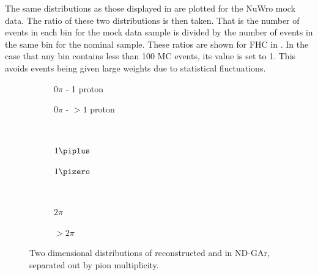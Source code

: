 The same distributions as those displayed in  are plotted for the NuWro mock data.
The ratio of these two distributions is then taken.
That is the number of events in each bin for the mock data sample is divided by the number of events in the same bin for the nominal sample.
These ratios are shown for FHC in .
In the case that any bin contains less than \num{100} MC events, its value is set to 1.
This avoids events being given large weights due to statistical fluctuations.

\begin{figure}[t]
	\begin{subfigure}[t]{.5\linewidth}
		\begin{adjustbox}{max totalsize=\linewidth, center}
			
		\end{adjustbox}
		\caption{$0\pi$ - 1 proton}
	\end{subfigure}
	\hfill
	\begin{subfigure}[t]{.5\linewidth}
		\begin{adjustbox}{max totalsize=\linewidth, center}
			
		\end{adjustbox}
		\caption{$0\pi$ - $>1$ proton}
	\end{subfigure} \\
	\begin{subfigure}[t]{.5\linewidth}
		\begin{adjustbox}{max totalsize=\linewidth, center}
			
		\end{adjustbox}
		\caption{$1\piplus$}
	\end{subfigure}
	\hfill
	\begin{subfigure}[t]{.5\linewidth}
		\begin{adjustbox}{max totalsize=\linewidth, center}
			
		\end{adjustbox}
		\caption{$1\pizero$}
	\end{subfigure} \\
	\begin{subfigure}[t]{.5\linewidth}
		\begin{adjustbox}{max totalsize=\linewidth, center}
			
		\end{adjustbox}
		\caption{$2\pi$}
	\end{subfigure}
	\hfill
	\begin{subfigure}[t]{.5\linewidth}
		\begin{adjustbox}{max totalsize=\linewidth, center}
			
		\end{adjustbox}
		\caption{$>2\pi$}
	\end{subfigure}
	\caption[Ratio of NuWro to GENIE of two-dimensional distributions of \evis and \pvis in ND-GAr]{Two dimensional distributions of reconstructed \evis and \pvis in ND-GAr, separated out by pion multiplicity.}
	\label{fig:q0q3RatioFhc}
\end{figure}

